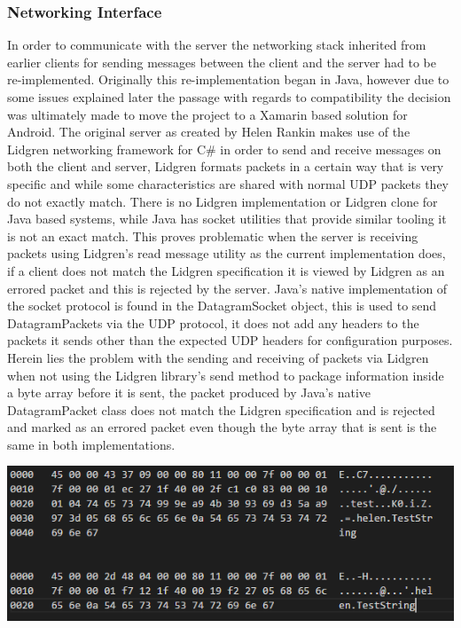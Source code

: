 \documentclass{article}
\begin{document}
\subsubsection{Networking Interface}
In order to communicate with the server the networking stack inherited from earlier clients for sending messages between the client and the server had to be re-implemented. Originally this re-implementation began in Java, however due to some issues explained later the passage with regards to compatibility the decision was ultimately made to move the project to a Xamarin based solution for Android. The original server as created by Helen Rankin makes use of the Lidgren networking framework for C\# in order to send and receive messages on both the client and server, Lidgren formats packets in a certain way that is very specific and while some characteristics are shared with normal UDP packets they do not exactly match. There is no Lidgren implementation or Lidgren clone for Java based systems, while Java has socket utilities that provide similar tooling it is not an exact match. This proves problematic when the server is receiving packets using Lidgren’s read message utility as the current implementation does, if a client does not match the Lidgren specification it is viewed by Lidgren as an errored packet and this is rejected by the server. Java’s native implementation of the socket protocol is found in the DatagramSocket object, this is used to send DatagramPackets via the UDP protocol, it does not add any headers to the packets it sends other than the expected UDP headers for configuration purposes. Herein lies the problem with the sending and receiving of packets via Lidgren when not using the Lidgren library’s send method to package information inside a byte array before it is sent, the packet produced by Java’s native DatagramPacket class does not match the Lidgren specification and is rejected and marked as an errored packet even though the byte array that is sent is the same in both implementations. \\
\begin{center}
\includegraphics{packetdiff.png}
\end{center}
\end{document}
